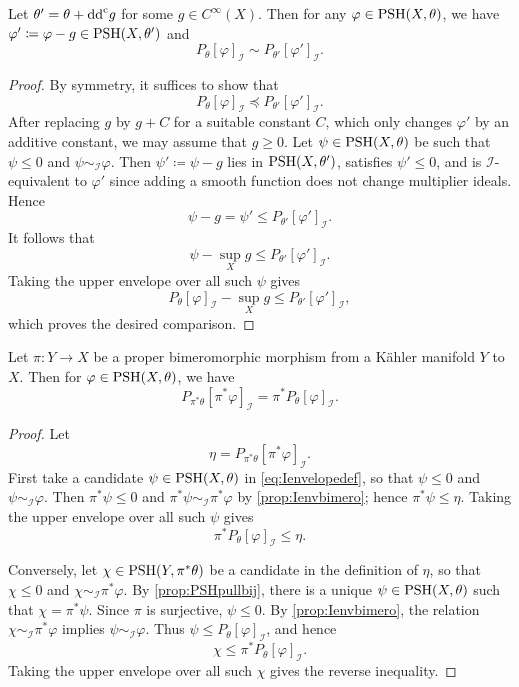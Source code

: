 \begin{proposition}\label{prop:Ienvindeptheta}
    Let $\theta'=\theta+\mathrm{dd}^{\mathrm{c}} g$ for some $g\in C^{\infty}(X)$. Then for any $\varphi\in \mathrm{PSH}(X,\theta)$, we have $\varphi'\coloneqq \varphi-g\in \mathrm{PSH}(X,\theta')$ and
    \[
        P_{\theta}[\varphi]_{\mathcal{I}}\sim P_{\theta'}[\varphi']_{\mathcal{I}}.
    \]
\end{proposition}
\begin{proof}
    By symmetry, it suffices to show that
    \[
        P_{\theta}[\varphi]_{\mathcal{I}}\preceq P_{\theta'}[\varphi']_{\mathcal{I}}.
    \]
    After replacing $g$ by $g+C$ for a suitable constant $C$, which only changes $\varphi'$ by an additive constant, we may assume that $g\geq 0$.
    Let $\psi\in \mathrm{PSH}(X,\theta)$ be such that $\psi\leq 0$ and $\psi\sim_{\mathcal{I}}\varphi$. Then $\psi'\coloneqq \psi-g$ lies in $\mathrm{PSH}(X,\theta')$, satisfies $\psi'\leq 0$, and is $\mathcal{I}$-equivalent to $\varphi'$ since adding a smooth function does not change multiplier ideals. Hence
    \[
        \psi-g=\psi'\leq P_{\theta'}[\varphi']_{\mathcal{I}}.
    \]
    It follows that
    \[
        \psi-\sup_X g\leq P_{\theta'}[\varphi']_{\mathcal{I}}.
    \]
    Taking the upper envelope over all such $\psi$ gives
    \[
        P_{\theta}[\varphi]_{\mathcal{I}}-\sup_X g\leq P_{\theta'}[\varphi']_{\mathcal{I}},
    \]
    which proves the desired comparison.
\end{proof}

\begin{proposition}\label{prop:Ienvelopebimero}
    Let $\pi\colon Y\rightarrow X$ be a proper bimeromorphic morphism from a Kähler manifold $Y$ to $X$. Then for $\varphi \in \mathrm{PSH}(X,\theta)$, we have
    \[
        P_{\pi^*\theta}[\pi^*\varphi]_{\mathcal{I}}=\pi^* P_{\theta}[\varphi]_{\mathcal{I}}.
    \]
\end{proposition}
\begin{proof}
    Let
    \[
        \eta=P_{\pi^*\theta}[\pi^*\varphi]_{\mathcal{I}}.
    \]
    First take a candidate $\psi\in \mathrm{PSH}(X,\theta)$ in \eqref{eq:Ienvelopedef}, so that $\psi\leq 0$ and $\psi\sim_{\mathcal{I}}\varphi$. Then $\pi^*\psi\leq 0$ and $\pi^*\psi\sim_{\mathcal{I}}\pi^*\varphi$ by \cref{prop:Ienvbimero}; hence $\pi^*\psi\leq \eta$. Taking the upper envelope over all such $\psi$ gives
    \[
        \pi^* P_{\theta}[\varphi]_{\mathcal{I}}\leq \eta.
    \]

    Conversely, let $\chi\in \mathrm{PSH}(Y,\pi^*\theta)$ be a candidate in the definition of $\eta$, so that $\chi\leq 0$ and $\chi\sim_{\mathcal{I}}\pi^*\varphi$. By \cref{prop:PSHpullbij}, there is a unique $\psi\in \mathrm{PSH}(X,\theta)$ such that $\chi=\pi^*\psi$. Since $\pi$ is surjective, $\psi\leq 0$. By \cref{prop:Ienvbimero}, the relation $\chi\sim_{\mathcal{I}}\pi^*\varphi$ implies $\psi\sim_{\mathcal{I}}\varphi$. Thus $\psi\leq P_{\theta}[\varphi]_{\mathcal{I}}$, and hence
    \[
        \chi\leq \pi^* P_{\theta}[\varphi]_{\mathcal{I}}.
    \]
    Taking the upper envelope over all such $\chi$ gives the reverse inequality.
\end{proof}

